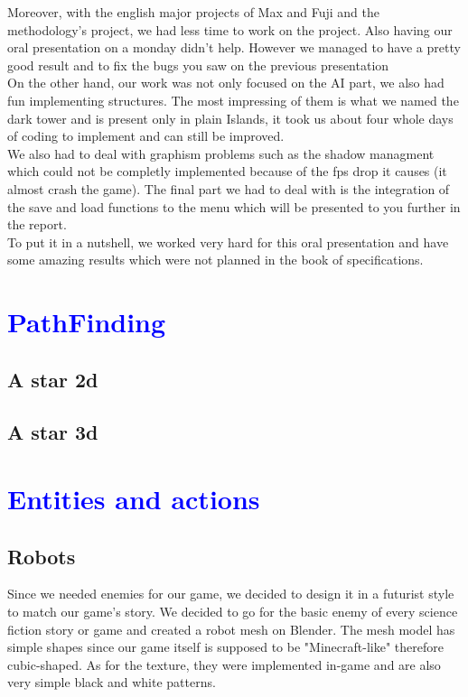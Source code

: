 \documentclass[article]{report}             %
\begin{document}
 			Moreover, with the english major projects of Max and Fuji and the methodology's project, we had less time to work on the project. Also having our oral presentation on a monday didn't help. However we managed to have a pretty good result and to fix the bugs you saw on the previous presentation\\

 			On the other hand, our work was not only focused on the AI part, we also had fun implementing structures. The most impressing of them is what we named the dark tower and is present only in plain Islands, it took us about four whole days of coding to implement and can still be improved.\\
			
			We also had to deal with graphism problems such as the shadow managment which could not be completly implemented because of the fps drop it causes (it almost crash the game). The final part we had to deal with is the integration of the save and load functions to the menu which will be presented to you further in the report.\\
			
			To put it in a nutshell, we worked very hard for this oral presentation and have some amazing results which were not planned in the book of specifications. 
  		\chapter{\textcolor{blue}{PathFinding}}
			\section{A star 2d}
			\section{A star 3d}
				
		\chapter{\textcolor{blue}{Entities and actions}}
			\section{Robots}
				Since we needed enemies for our game, we decided to design it in a futurist style to match our game's story. We decided to go for the basic enemy of every science fiction story or game and created a robot mesh on Blender. The mesh model has simple shapes since our game itself is supposed to be "Minecraft-like" therefore cubic-shaped. As for the texture, they were implemented in-game and are also very simple black and white patterns.\\
\end{document}
